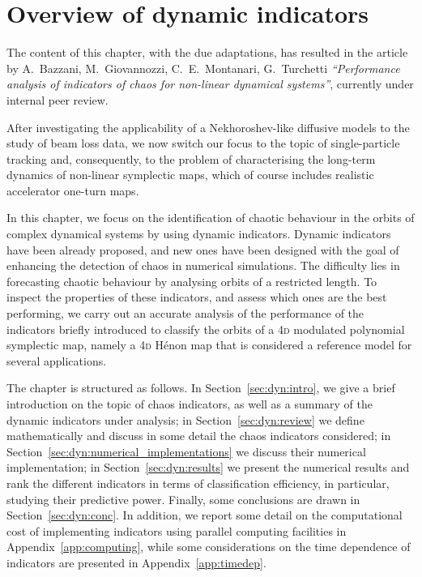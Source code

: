 \chapter{Overview of dynamic indicators}\label{ch:overview_of_dynamic_indicators}
\noindent\textsf{The content of this chapter, with the due adaptations, has resulted in the article by A.\ Bazzani, M.\ Giovannozzi, C.\ E.\ Montanari, G.\ Turchetti \textit{``Performance analysis of indicators of chaos for non-linear dynamical systems''}, currently under internal peer review.}

\vspace{3em}

After investigating the applicability of a Nekhoroshev-like diffusive models to the study of beam loss data, we now switch our focus to the topic of single-particle tracking and, consequently, to the problem of characterising the long-term dynamics of non-linear symplectic maps, which of course includes realistic accelerator one-turn maps.

In this chapter, we focus on the identification of chaotic behaviour in the orbits of complex dynamical systems by using dynamic indicators. Dynamic indicators have been already proposed, and new ones have been designed with the goal of enhancing the detection of chaos in numerical simulations. The difficulty lies in forecasting chaotic behaviour by analysing orbits of a restricted length. To inspect the properties of these indicators, and assess which ones are the best performing, we carry out an accurate analysis of the performance of the indicators briefly introduced to classify the orbits of a 4\textsc{d} modulated polynomial symplectic map, namely a 4\textsc{d} H\'enon map that is considered a reference model for several applications. 

The chapter is structured as follows. In Section~\ref{sec:dyn:intro}, we give a brief introduction on the topic of chaos indicators, as well as a summary of the dynamic indicators under analysis; in Section~\ref{sec:dyn:review} we define mathematically and discuss in some detail the chaos indicators considered; in Section~\ref{sec:dyn:numerical_implementations} we discuss their numerical implementation; in Section~\ref{sec:dyn:results} we present the numerical results and rank the different indicators in terms of classification efficiency, in particular, studying their predictive power. Finally, some conclusions are drawn in Section~\ref{sec:dyn:conc}. In addition, we report some detail on the computational cost of implementing indicators using parallel computing facilities in Appendix~\ref{app:computing}, while some considerations on the time dependence of indicators are presented in Appendix~\ref{app:timedep}. 


